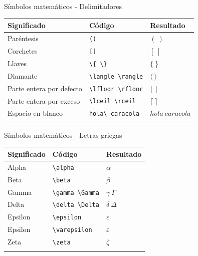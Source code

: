 \documentclass[
  ignorenonframetext,
  aspectratio=169]{beamer}
\begin{document}
\begin{frame}[fragile]{Símbolos matemáticos - Delimitadores}
\label{suxedmbolos-matemuxe1ticos---delimitadores}
\begin{longtable}[]{@{}lll@{}}
\toprule\noalign{}
Significado & Código & Resultado \\
\midrule\noalign{}
\endhead
Paréntesis & \texttt{()} & \((\ )\) \\
Corchetes & \texttt{{[}{]}} & \([\ ]\) \\
Llaves & \texttt{\textbackslash{}\{\ \textbackslash{}\}} & \(\{\ \}\) \\
Diamante & \texttt{\textbackslash{}langle\ \textbackslash{}rangle} &
\(\langle\ \rangle\) \\
Parte entera por defecto &
\texttt{\textbackslash{}lfloor\ \textbackslash{}rfloor} &
\(\lfloor\  \rfloor\) \\
Parte entera por exceso &
\texttt{\textbackslash{}lceil\ \textbackslash{}rceil} &
\(\lceil\ \rceil\) \\
Espacio en blanco & \texttt{hola\textbackslash{}\ caracola} &
\(hola\ caracola\) \\
\bottomrule\noalign{}
\end{longtable}
\end{frame}

\begin{frame}[fragile]{Símbolos matemáticos - Letras griegas}
\label{suxedmbolos-matemuxe1ticos---letras-griegas}
\begin{longtable}[]{@{}lll@{}}
\toprule\noalign{}
Significado & Código & Resultado \\
\midrule\noalign{}
\endhead
Alpha & \texttt{\textbackslash{}alpha} & \(\alpha\) \\
Beta & \texttt{\textbackslash{}beta} & \(\beta\) \\
Gamma & \texttt{\textbackslash{}gamma\ \textbackslash{}Gamma} &
\(\gamma\  \Gamma\) \\
Delta & \texttt{\textbackslash{}delta\ \textbackslash{}Delta} &
\(\delta\  \Delta\) \\
Epsilon & \texttt{\textbackslash{}epsilon} & \(\epsilon\) \\
Epsilon & \texttt{\textbackslash{}varepsilon} & \(\varepsilon\) \\
Zeta & \texttt{\textbackslash{}zeta} & \(\zeta\) \\
\bottomrule\noalign{}
\end{longtable}
\end{frame}
\end{document}
